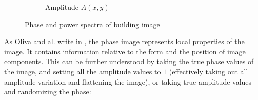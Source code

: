 \documentclass{report}
\begin{document}
\begin{figure}[H]
\begin{subfigure}[b]{0.2\textwidth}
                \caption{Amplitude $A(x,y)$}
                \label{fig:tiger}
        \end{subfigure}
        \caption{Phase and power spectra of building image}\label{fig:fft_localization}
\end{figure}
As Oliva and al. write in \cite{gist_descriptor}, the phase image represents local properties of the image. It contains information relative to the form and the position of image components. This can be further understood by taking the true phase values of the image, and setting all the amplitude values to $1$ (effectively taking out all amplitude variation and flattening the image), or taking true amplitude values and randomizing the phase:
\end{document}
